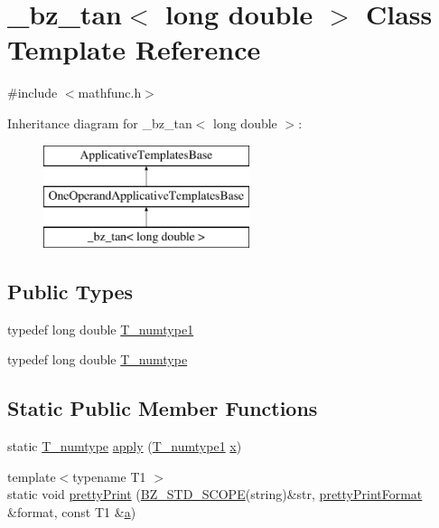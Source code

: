 \hypertarget{class__bz__tan_3_01long_01double_01_4}{}\section{\+\_\+bz\+\_\+tan$<$ long double $>$ Class Template Reference}
\label{class__bz__tan_3_01long_01double_01_4}


{\ttfamily \#include $<$mathfunc.\+h$>$}

Inheritance diagram for \+\_\+bz\+\_\+tan$<$ long double $>$\+:\begin{figure}[H]
\begin{center}
\leavevmode
\includegraphics[height=3.000000cm]{class__bz__tan_3_01long_01double_01_4}
\end{center}
\end{figure}
\subsection*{Public Types}
\begin{DoxyCompactItemize}
\item 
typedef long double \hyperlink{class__bz__tan_3_01long_01double_01_4_a6eef30a67ba88a7213c5fe1376fcb28a}{T\+\_\+numtype1}
\item 
typedef long double \hyperlink{class__bz__tan_3_01long_01double_01_4_a87508ef567b562ac929d732f666cd4d3}{T\+\_\+numtype}
\end{DoxyCompactItemize}
\subsection*{Static Public Member Functions}
\begin{DoxyCompactItemize}
\item 
static \hyperlink{class__bz__tan_3_01long_01double_01_4_a87508ef567b562ac929d732f666cd4d3}{T\+\_\+numtype} \hyperlink{class__bz__tan_3_01long_01double_01_4_ac1f3a2629c3d019613638f58ad63561e}{apply} (\hyperlink{class__bz__tan_3_01long_01double_01_4_a6eef30a67ba88a7213c5fe1376fcb28a}{T\+\_\+numtype1} \hyperlink{vecnorm1_8cc_ac73eed9e41ec09d58f112f06c2d6cb63}{x})
\item 
{\footnotesize template$<$typename T1 $>$ }\\static void \hyperlink{class__bz__tan_3_01long_01double_01_4_ae5120d4e74312ef42c94e0f436388396}{pretty\+Print} (\hyperlink{numinquire_8h_a2b24ffc3b4ef9803956bc7715c6c7b83}{B\+Z\+\_\+\+S\+T\+D\+\_\+\+S\+C\+O\+P\+E}(string)\&str, \hyperlink{classprettyPrintFormat}{pretty\+Print\+Format} \&format, const T1 \&\hyperlink{gen__mat5files_8m_aae328bf20413f220e38aec4d95bfd6da}{a})
\end{DoxyCompactItemize}


